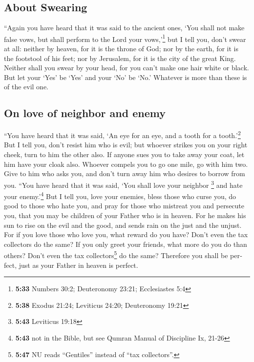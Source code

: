 \begin{paracol}{2}
\begin{otherlanguage}{english}
\hypertarget{about-swearing}{%
\subsection{About Swearing}\label{about-swearing}}

 ``Again you have heard that it was said to the ancient
ones, `You shall not make false vows, but shall perform to the Lord your
vows,'\footnote{\textbf{5:33} Numbers 30:2; Deuteronomy 23:21;
  Ecclesiastes 5:4}  but I tell you, don't swear at all:
neither by heaven, for it is the throne of God;  nor by
the earth, for it is the footstool of his feet; nor by Jerusalem, for it
is the city of the great King.  Neither shall you swear
by your head, for you can't make one hair white or black.
 But let your `Yes' be `Yes' and your `No' be `No.'
Whatever is more than these is of the evil one.

\hypertarget{on-love-of-neighbor-and-enemy}{%
\subsection{On love of neighbor and
enemy}\label{on-love-of-neighbor-and-enemy}}

 ``You have heard that it was said, `An eye for an eye,
and a tooth for a tooth.'\footnote{\textbf{5:38} Exodus 21:24; Leviticus
  24:20; Deuteronomy 19:21}  But I tell you, don't resist
him who is evil; but whoever strikes you on your right cheek, turn to
him the other also.  If anyone sues you to take away your
coat, let him have your cloak also.  Whoever compels you
to go one mile, go with him two.  Give to him who asks
you, and don't turn away him who desires to borrow from you.
 ``You have heard that it was said, `You shall love your
neighbor \footnote{\textbf{5:43} Leviticus 19:18} and hate your
enemy.'\footnote{\textbf{5:43} not in the Bible, but see Qumran Manual
  of Discipline Ix, 21-26}  But I tell you, love your
enemies, bless those who curse you, do good to those who hate you, and
pray for those who mistreat you and persecute you,  that
you may be children of your Father who is in heaven. For he makes his
sun to rise on the evil and the good, and sends rain on the just and the
unjust.  For if you love those who love you, what reward
do you have? Don't even the tax collectors do the same? 
If you only greet your friends, what more do you do than others? Don't
even the tax collectors\footnote{\textbf{5:47} NU reads ``Gentiles''
  instead of ``tax collectors''.} do the same?  Therefore
you shall be perfect, just as your Father in heaven is perfect.


\end{otherlanguage}
\end{paracol}
